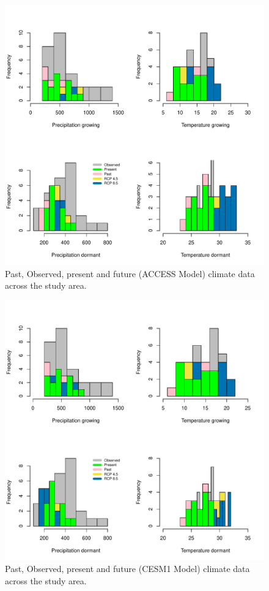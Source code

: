 \documentclass[12pt]{article}\usepackage[]{graphicx}\usepackage[dvipsnames]{xcolor}
\begin{document}
\begin{figure}[H]
		\centering
		\includegraphics[width=0.99\linewidth]{Figures/ACCESS.pdf}
		\caption{Past, Observed, present and future (ACCESS Model) climate data across the study area.}
		\label{Sup:projectionACCESS}
\end{figure}

\begin{figure}[H]
		\centering
		\includegraphics[width=0.99\linewidth]{Figures/CESM1.pdf}
		\caption{Past, Observed, present and future (CESM1 Model) climate data across the study area.}
		\label{Sup:projectionCESM1}
\end{figure}
\end{document}

